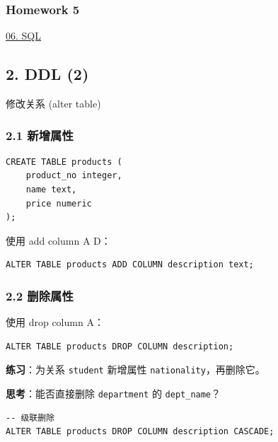 \documentclass[aspectratio=169, 14pt]{beamer}
\begin{document}
\begin{frame}
	\frametitle{Homework 5}

	\href{https://github.com/ChenZhongPu/db-swufe/tree/master/06_sql}{06. SQL}

\end{frame}

\begin{frame}
	\section{\textcolor{darkmidnightblue}{2. DDL (2)}}
	修改关系 (\alert{alter table})
\end{frame}

\begin{frame}[fragile]
	\frametitle{2.1 新增属性}

	\begin{verbatim}
CREATE TABLE products (
    product_no integer,
    name text,
    price numeric
);
    \end{verbatim}

	使用 \alert{add column A D}：

	\begin{verbatim}
ALTER TABLE products ADD COLUMN description text;    
\end{verbatim}

\end{frame}

\begin{frame}[fragile]
	\frametitle{2.2 删除属性}
	使用 \alert{drop column A}：
	\begin{verbatim}
ALTER TABLE products DROP COLUMN description; 
    \end{verbatim}
	{\large {}}  \textbf{练习}：为关系 \texttt{student} 新增属性 \texttt{nationality}，再删除它。

	\pause
	{\large {}}  \textbf{思考}：能否直接删除 \texttt{department} 的 \texttt{dept\_name}？

	\pause

	\begin{verbatim}
-- 级联删除
ALTER TABLE products DROP COLUMN description CASCADE;
\end{verbatim}

\end{frame}
\end{document}
